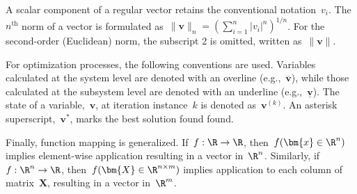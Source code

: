 A scalar component of a regular vector retains the conventional notation~\(v_i\). The~\(n^\text{th}\) norm of a vector is formulated as~\(\|\bm{v}\|_n = {(\sum_{i=1}^n |v_i|^n)}^{1/n}\). For the second-order (Euclidean) norm, the subscript 2 is omitted, written as~\(\|\bm{v}\|\).

For optimization processes, the following conventions are used. Variables calculated at the system level are denoted with an overline (e.g.,~\(\overline{\bm{v}}\)), while those calculated at the subsystem level are denoted with an underline (e.g.,~\(\underline{\bm{v}}\)). The state of a variable,~\(\bm{v}\), at iteration instance~\(k\) is denoted as~\(\bm{v}^{(k)}\). An asterisk superscript,~\(\bm{v}^*\), marks the best solution found found.

Finally, function mapping is generalized. If~\(f: \R \to \R\), then~\(f(\bm{x} \in \R^n)\) implies element-wise application resulting in a vector in~\(\R^n\). Similarly, if~\(f: \R^n \to \R\), then~\(f(\bm{X} \in \R^{n \times m})\) implies application to each column of matrix~\(\bm{X}\), resulting in a vector in~\(\R^m\).
